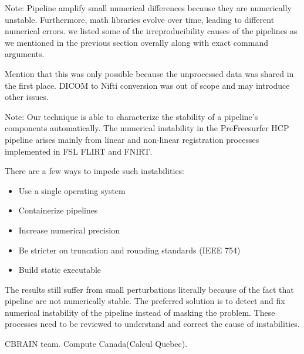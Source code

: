\documentclass[a4paper,num-refs]{oup-contemporary}
\newcommand{\note}[2]{\color{blue}Note: #1\color{black}}
\begin{document}
\note{Pipeline amplify small numerical differences because they are numerically 
unstable. Furthermore, math libraries evolve over time, leading to 
different numerical errors. we listed some of the irreproducibility 
causes of the pipelines as we mentioned in the previous section 
overally along with exact command arguments.

Mention that this was only possible because the unprocessed data was 
shared in the first place. DICOM to Nifti conversion was out of scope 
and may introduce other issues.}

\section{Conclusion}

\note{Our technique is able to characterize the stability of a pipeline's 
components automatically. The numerical instability in the 
PreFreesurfer HCP pipeline arises mainly from linear and non-linear 
registration processes implemented in FSL FLIRT and FNIRT. 

There are a few ways to impede such instabilities:
\begin{itemize}
\item Use a single operating system
\item Containerize pipelines
\item Increase numerical precision
\item Be stricter on truncation and rounding standards (IEEE 754)
\item Build static executable
\end{itemize}

The results still suffer from small perturbations literally because of 
the fact that pipeline are not numerically stable. The preferred 
solution is to detect and fix numerical instability of the pipeline 
instead of masking the problem. These processes need to be reviewed to 
understand and correct the cause of instabilities. }



\section{Acknowledgments}

CBRAIN team. Compute Canada(Calcul Quebec).
\end{document}
